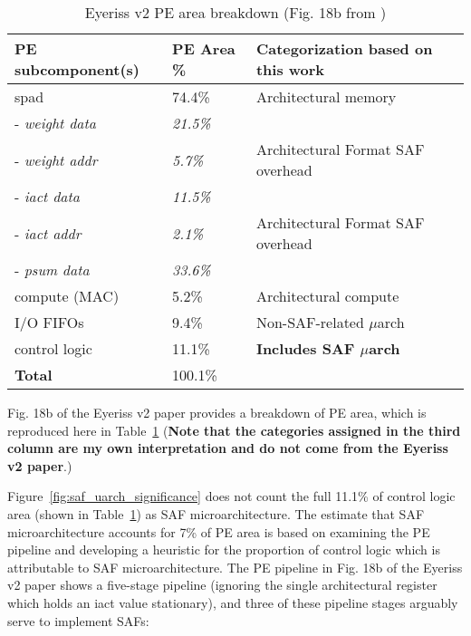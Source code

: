 \begin{table}
\caption{Eyeriss v2 PE area breakdown (Fig. 18b from \cite{eyerissv2})}
\label{tab:eyerissv2_pe_breakdown}
\begin{center}
\begin{tabular}{||l|l|l||}\hline
\textbf{PE subcomponent(s)} & \textbf{PE Area} \%  & \textbf{Categorization based on this work}  \\\hline
spad	   & 74.4\% & Architectural memory \\\hline
- \textit{weight data}	   & \textit{21.5\%} &\\\hline
- \textit{weight addr}	   & \textit{5.7\%} & Architectural Format SAF overhead\\\hline
- \textit{iact data}	   & \textit{11.5\%} &\\\hline
- \textit{iact addr}	   & \textit{2.1\%} & Architectural Format SAF overhead \\\hline
- \textit{psum data}   & \textit{33.6\%} &\\\hline
compute (MAC)	   & 5.2\% & Architectural compute \\\hline
I/O FIFOs	   & 9.4\% & Non-SAF-related $\mu$arch\\\hline
control logic	   & 11.1\% & \textbf{Includes SAF $\mu$arch} \\\hline
\textbf{Total}	   & 100.1\% & \\\hline
\end{tabular}
\end{center}
\end{table}

Fig. 18b of the Eyeriss v2 paper\cite{eyerissv2} provides a breakdown of PE area, which is reproduced here in Table~\ref{tab:eyerissv2_pe_breakdown} (\textbf{Note that the categories assigned in the third column are my own interpretation and do not come from the Eyeriss v2 paper}.)

Figure~\ref{fig:saf_uarch_significance} does not count the full 11.1\% of control logic area (shown in Table~\ref{tab:eyerissv2_pe_breakdown}) as SAF microarchitecture. The estimate that SAF microarchitecture accounts for 7\% of PE area is based on examining the PE pipeline and developing a heuristic for the proportion of control logic which is attributable to SAF microarchitecture. The PE pipeline in Fig. 18b of the Eyeriss v2 paper\cite{eyerissv2} shows a five-stage pipeline (ignoring the single architectural register which holds an iact value stationary), and three of these pipeline stages arguably serve to implement SAFs: 

